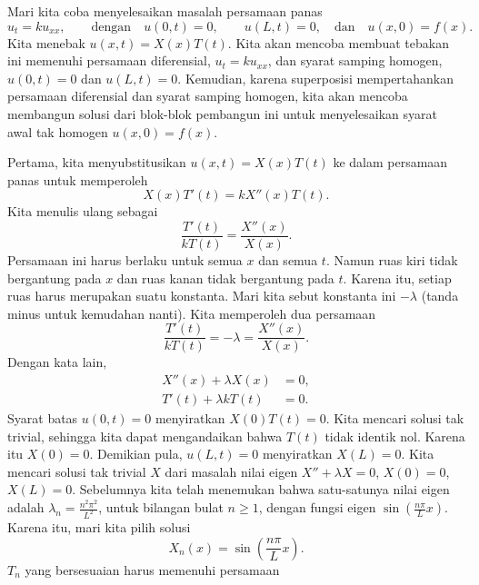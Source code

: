 Mari kita coba menyelesaikan masalah persamaan panas
\begin{equation*}
u_t = k u_{xx},
\qquad \text{dengan} \quad
u(0,t) = 0 ,\quad \quad u(L,t) = 0,
\quad \text{dan} \quad u(x,0) = f(x) .
\end{equation*}
Kita menebak $u(x,t) = X(x)T(t)$.  Kita akan mencoba membuat tebakan ini memenuhi
persamaan diferensial, $u_t = k u_{xx}$, dan syarat samping homogen,
$u(0,t) = 0$ dan $u(L,t) = 0$.  Kemudian, karena superposisi mempertahankan
persamaan diferensial dan syarat samping homogen, kita akan mencoba
membangun solusi dari blok-blok pembangun ini untuk menyelesaikan
syarat awal tak homogen $u(x,0) = f(x)$.

Pertama, kita menyubstitusikan $u(x,t) = X(x)T(t)$ ke dalam persamaan panas untuk
memperoleh
\begin{equation*}
X(x)T'(t) = k X''(x)T(t) .
\end{equation*}
Kita menulis ulang sebagai
\begin{equation*}
\frac{T'(t)}{k T(t)} =
\frac{X''(x)}{X(x)} .
\end{equation*}
Persamaan ini harus berlaku untuk semua $x$ dan semua $t$.  Namun
ruas kiri tidak bergantung pada $x$ dan ruas kanan tidak
bergantung pada $t$.  Karena itu, setiap ruas harus merupakan suatu konstanta.  Mari kita sebut
konstanta ini $-\lambda$ (tanda minus untuk kemudahan nanti).
Kita memperoleh dua persamaan
\begin{equation*}
\frac{T'(t)}{k T(t)} = -\lambda =
\frac{X''(x)}{X(x)} .
\end{equation*}
Dengan kata lain,
\begin{align*}
X''(x) + \lambda X(x) &= 0 , \\
T'(t) + \lambda k T(t) &= 0 .
\end{align*}
Syarat batas $u(0,t) = 0$ menyiratkan $X(0)T(t) = 0$.  Kita mencari
solusi tak trivial, sehingga kita dapat mengandaikan bahwa $T(t)$ tidak identik
nol.  Karena itu $X(0) = 0$.  Demikian pula, $u(L,t) = 0$ menyiratkan $X(L) = 0$.  Kita
mencari solusi tak trivial $X$ dari masalah nilai eigen
$X'' + \lambda X = 0$, $X(0) = 0$, $X(L) = 0$.  Sebelumnya kita telah menemukan bahwa
satu-satunya nilai eigen adalah $\lambda_n = \frac{n^2 \pi^2}{L^2}$, untuk bilangan bulat
$n \geq 1$,
dengan fungsi eigen $\sin \left(\frac{n \pi}{L} x\right)$.  Karena itu, mari kita pilih
solusi
\begin{equation*}
X_n (x) = \sin \left(\frac{n \pi}{L} x \right) .
\end{equation*}
$T_n$ yang bersesuaian harus memenuhi persamaan
